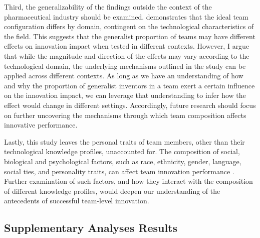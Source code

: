 \documentclass{article}
\begin{document}
Third, the generalizability of the findings outside the context of the pharmaceutical industry should be examined. \textcite{Vakili2021} demonstrates that the ideal team configuration differs by domain, contingent on the technological characteristics of the field. This suggests that the generalist proportion of teams may have different effects on innovation impact when tested in different contexts. However, I argue that while the magnitude and direction of the effects may vary according to the technological domain, the underlying mechanisms outlined in the study can be applied across different contexts. As long as we have an understanding of how and why the proportion of generalist inventors in a team exert a certain influence on the innovation impact, we can leverage that understanding to infer how the effect would change in different settings. Accordingly, future research should focus on further uncovering the mechanisms through which team composition affects innovative performance.

Lastly, this study leaves the personal traits of team members, other than their technological knowledge profiles, unaccounted for. The composition of social, biological and psychological factors, such as race, ethnicity, gender, language, social ties, and personality traits, can affect team innovation performance \autocite{Gruenfeld1996,Dahlin2005,Fleming2007,PerrySmith2014}. Further examination of such factors, and how they interact with the composition of different knowledge profiles, would deepen our understanding of the antecedents of successful team-level innovation.

\newpage
\printbibliography[heading=bibintoc]

\newpage
\begin{appendices}
\section{Supplementary Analyses Results} 









\end{appendices}
\end{document}
